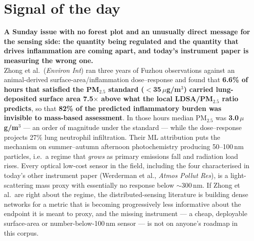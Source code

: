 \documentclass[10pt]{article}
\begin{document}
\vspace{6mm}

\section*{\sffamily\bfseries\color{Deep}Signal of the day}
\vspace{-1.5mm}{\color{Amber}\rule{\linewidth}{1.1pt}}\vspace{2.5mm}

\begin{keybox}
{\sffamily\bfseries\small\color{Deep}A Sunday issue with no forest plot and an unusually
direct message for the sensing side: the quantity being regulated and the quantity that
drives inflammation are coming apart, and today's instrument paper is measuring the wrong
one.}\\[1.4mm]
\footnotesize
Zhong et al.\ (\textit{Environ Int}) ran three years of Fuzhou observations against an
animal-derived surface-area/inflammation dose--response and found that \textbf{6.6\% of
hours that satisfied the PM$_{2.5}$ standard ($<$35\,$\mu$g/m$^3$) carried
lung-deposited surface area 7.5$\times$ above what the local LDSA/PM$_{2.5}$ ratio
predicts}, so that \textbf{82\% of the predicted inflammatory burden was invisible to
mass-based assessment}. In those hours median PM$_{2.5}$ was \textbf{3.0\,$\mu$g/m$^3$}
--- an order of magnitude under the standard --- while the dose--response projects 27\%
lung neutrophil infiltration. Their ML attribution puts the mechanism on summer--autumn
afternoon photochemistry producing 50--100\,nm particles, i.e.\ a regime that
\emph{grows} as primary emissions fall and radiation load rises. Every optical low-cost
sensor in the field, including the four characterised in today's other instrument paper
(Werderman et al., \textit{Atmos Pollut Res}), is a light-scattering mass proxy with
essentially no response below $\sim$300\,nm. If Zhong et al.\ are right about the
regime, the distributed-sensing literature is building dense networks for a metric that
is becoming progressively less informative about the endpoint it is meant to proxy, and
the missing instrument --- a cheap, deployable surface-area or number-below-100\,nm
sensor --- is not on anyone's roadmap in this corpus.
\end{keybox}

\vspace{3mm}

\end{document}
